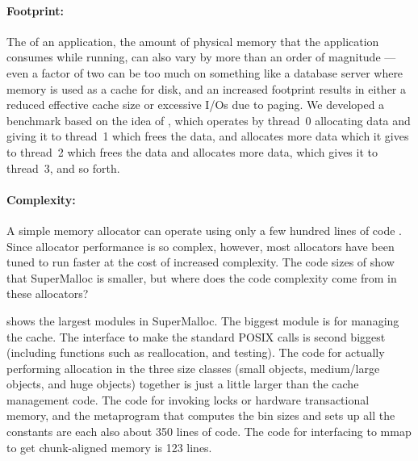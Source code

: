 \documentclass[pldi]{sigplanconf-pldi15}
\begin{document}
{\paragraph{Footprint:}} The  of an
application, the amount of physical memory that the application
consumes while running, can also vary by more than an order of
magnitude --- even a factor of two can be too much on something like a
database server where memory is used as a cache for disk, and an
increased footprint results in either a reduced effective cache size
or excessive I/Os due to paging.  We developed a benchmark based on
the idea of \cite{Vyukov08}, which operates by thread~0 allocating
data and giving it to thread~1 which frees the data, and allocates
more data which it gives to thread~2 which frees the data and
allocates more data, which gives it to thread~3, and so forth.

{\paragraph{Complexity:}} A simple memory allocator can operate using
only a few hundred lines of code \cite{KernighanRi88}.  Since
allocator performance is so complex, however, most allocators have
been tuned to run faster at the cost of increased complexity.  The
code sizes of  show that SuperMalloc is smaller, but
where does the code complexity come from in these allocators?

 shows the largest modules in SuperMalloc.  The
biggest module is for managing the cache.  The interface to make the
standard POSIX calls is second biggest (including functions such as
reallocation, and testing).  The code for actually performing
allocation in the three size classes (small objects, medium/large objects, and huge objects)
together is just a little larger than the cache management code.  The
code for invoking locks or hardware transactional memory, and the
metaprogram that computes the bin sizes and sets up all the constants
are each also about 350 lines of code.  The code for interfacing to
mmap to get chunk-aligned memory is 123 lines.
\end{document}
